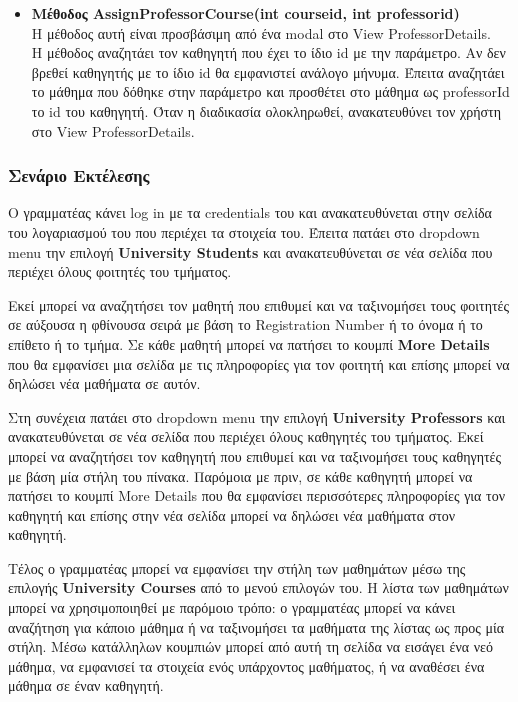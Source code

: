 \documentclass[12pt]{article}
\begin{document}
\begin{itemize}
	\item \textbf{Μέθοδος AssignProfessorCourse(int courseid, int professorid)}\\
	Η μέθοδος αυτή είναι προσβάσιμη από ένα modal στο View ProfessorDetails.\\
	Η μέθοδος αναζητάει τον καθηγητή που έχει το ίδιο id με την παράμετρο. Αν δεν βρεθεί καθηγητής με το ίδιο id θα εμφανιστεί ανάλογο μήνυμα. Έπειτα αναζητάει το μάθημα που δόθηκε στην παράμετρο και προσθέτει στο μάθημα ως professorId το id του καθηγητή. Όταν η διαδικασία ολοκληρωθεί, ανακατευθύνει τον χρήστη στο View ProfessorDetails.
	
\end{itemize}
	
	
\subsubsection{Σενάριο Εκτέλεσης}
Ο γραμματέας κάνει log in με τα credentials του και ανακατευθύνεται στην σελίδα του λογαριασμού του που περιέχει τα στοιχεία του. Έπειτα πατάει στο dropdown menu την επιλογή \textbf{University Students} και ανακατευθύνεται σε νέα σελίδα που περιέχει όλους φοιτητές του τμήματος. 

Εκεί μπορεί να αναζητήσει τον μαθητή που επιθυμεί και να ταξινομήσει τους φοιτητές σε αύξουσα η φθίνουσα σειρά με βάση το Registration Number ή το όνομα ή το επίθετο ή το τμήμα. Σε κάθε μαθητή μπορεί να πατήσει το κουμπί \textbf{More Details} που θα εμφανίσει μια σελίδα με τις πληροφορίες  για τον φοιτητή και επίσης μπορεί να δηλώσει νέα μαθήματα σε αυτόν. 

Στη συνέχεια πατάει στο dropdown menu την επιλογή \textbf{University Professors} και ανακατευθύνεται σε νέα σελίδα που περιέχει όλους καθηγητές του τμήματος. Εκεί μπορεί να αναζητήσει τον καθηγητή που επιθυμεί και να ταξινομήσει τους καθηγητές με βάση μία στήλη του πίνακα. Παρόμοια με πριν, σε κάθε καθηγητή μπορεί να πατήσει το κουμπί More Details που θα εμφανίσει περισσότερες πληροφορίες  για τον καθηγητή και επίσης στην νέα σελίδα μπορεί να δηλώσει νέα μαθήματα στον καθηγητή.

Τέλος ο γραμματέας μπορεί να εμφανίσει την στήλη των μαθημάτων μέσω της επιλογής \textbf{University Courses} από το μενού επιλογών του. Η λίστα των μαθημάτων μπορεί να χρησιμοποιηθεί με παρόμοιο τρόπο: ο γραμματέας μπορεί να κάνει αναζήτηση για κάποιο μάθημα ή να ταξινομήσει τα μαθήματα της λίστας ως προς μία στήλη. Μέσω κατάλληλων κουμπιών μπορεί από αυτή τη σελίδα να εισάγει ένα νεό μάθημα, να εμφανισεί τα στοιχεία ενός υπάρχοντος μαθήματος, ή να αναθέσει ένα μάθημα σε έναν καθηγητή.
\end{document}
